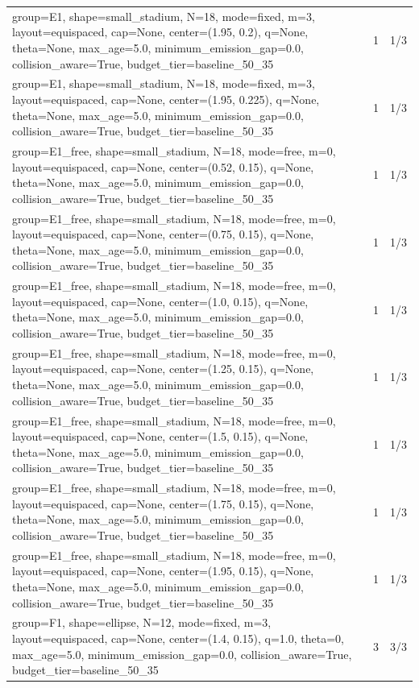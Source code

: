 \begin{tabular}{p{11cm}rr}
group=E1, shape=small\_stadium, N=18, mode=fixed, m=3, layout=equispaced, cap=None, center=(1.95, 0.2), q=None, theta=None, max\_age=5.0, minimum\_emission\_gap=0.0, collision\_aware=True, budget\_tier=baseline\_50\_35 & 1 & 1/3 \\
group=E1, shape=small\_stadium, N=18, mode=fixed, m=3, layout=equispaced, cap=None, center=(1.95, 0.225), q=None, theta=None, max\_age=5.0, minimum\_emission\_gap=0.0, collision\_aware=True, budget\_tier=baseline\_50\_35 & 1 & 1/3 \\
group=E1\_free, shape=small\_stadium, N=18, mode=free, m=0, layout=equispaced, cap=None, center=(0.52, 0.15), q=None, theta=None, max\_age=5.0, minimum\_emission\_gap=0.0, collision\_aware=True, budget\_tier=baseline\_50\_35 & 1 & 1/3 \\
group=E1\_free, shape=small\_stadium, N=18, mode=free, m=0, layout=equispaced, cap=None, center=(0.75, 0.15), q=None, theta=None, max\_age=5.0, minimum\_emission\_gap=0.0, collision\_aware=True, budget\_tier=baseline\_50\_35 & 1 & 1/3 \\
group=E1\_free, shape=small\_stadium, N=18, mode=free, m=0, layout=equispaced, cap=None, center=(1.0, 0.15), q=None, theta=None, max\_age=5.0, minimum\_emission\_gap=0.0, collision\_aware=True, budget\_tier=baseline\_50\_35 & 1 & 1/3 \\
group=E1\_free, shape=small\_stadium, N=18, mode=free, m=0, layout=equispaced, cap=None, center=(1.25, 0.15), q=None, theta=None, max\_age=5.0, minimum\_emission\_gap=0.0, collision\_aware=True, budget\_tier=baseline\_50\_35 & 1 & 1/3 \\
group=E1\_free, shape=small\_stadium, N=18, mode=free, m=0, layout=equispaced, cap=None, center=(1.5, 0.15), q=None, theta=None, max\_age=5.0, minimum\_emission\_gap=0.0, collision\_aware=True, budget\_tier=baseline\_50\_35 & 1 & 1/3 \\
group=E1\_free, shape=small\_stadium, N=18, mode=free, m=0, layout=equispaced, cap=None, center=(1.75, 0.15), q=None, theta=None, max\_age=5.0, minimum\_emission\_gap=0.0, collision\_aware=True, budget\_tier=baseline\_50\_35 & 1 & 1/3 \\
group=E1\_free, shape=small\_stadium, N=18, mode=free, m=0, layout=equispaced, cap=None, center=(1.95, 0.15), q=None, theta=None, max\_age=5.0, minimum\_emission\_gap=0.0, collision\_aware=True, budget\_tier=baseline\_50\_35 & 1 & 1/3 \\
group=F1, shape=ellipse, N=12, mode=fixed, m=3, layout=equispaced, cap=None, center=(1.4, 0.15), q=1.0, theta=0, max\_age=5.0, minimum\_emission\_gap=0.0, collision\_aware=True, budget\_tier=baseline\_50\_35 & 3 & 3/3 \\

\end{tabular}
